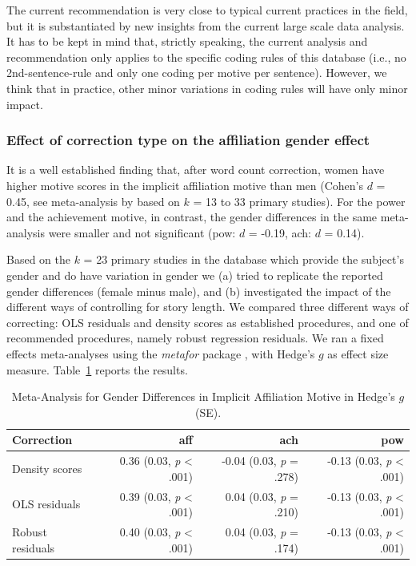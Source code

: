 \documentclass[man,a4paper,mask]{apa6}\usepackage[]{graphicx}\usepackage[]{color}
\begin{document}
The current recommendation is very close to typical current practices in the field, but it is substantiated by new insights from the current large scale data analysis. It has to be kept in mind that, strictly speaking, the current analysis and recommendation only applies to the specific coding rules of this database (i.e., no 2nd-sentence-rule and only one coding per motive per sentence). However, we think that in practice, other minor variations in coding rules will have only minor impact.


\subsubsection{Effect of correction type on the affiliation gender effect}
It is a well established finding that, after word count correction, women have higher motive scores in the implicit affiliation motive than men (Cohen's $d$ = 0.45, see meta-analysis by  based on $k$ = 13 to 33 primary studies). 
For the power and the achievement motive, in contrast, the gender differences in the same meta-analysis were smaller and not significant (pow: $d$ = -0.19, ach: $d$ = 0.14).

Based on the $k$ = 23 primary studies in the database which provide the subject's gender and do have variation in gender we (a) tried to replicate the reported gender differences (female minus male), and (b) investigated the impact of the different ways of controlling for story length.
We compared three different ways of correcting: OLS residuals and density scores as established procedures, and one of recommended procedures, namely robust regression residuals. We ran a fixed effects meta-analyses using the \emph{metafor} package \parencite{viechtbauer_conducting_2010}, with Hedge's $g$ as effect size measure. Table~\ref{tab:MA} reports the results. 

\begin{table}
		\caption{Meta-Analysis for Gender Differences in Implicit Affiliation Motive in Hedge's $g$ (SE).}
		\label{tab:MA}
		\footnotesize
		\begin{tabularx}{\textwidth}{lrrr}
		\toprule

Correction & aff & ach & pow \\ 
  \hline
Density scores & 0.36 (0.03, \emph{p} < .001) & -0.04 (0.03, \emph{p} = .278) & -0.13 (0.03, \emph{p} < .001) \\ 
  OLS residuals & 0.39 (0.03, \emph{p} < .001) & 0.04 (0.03, \emph{p} = .210) & -0.13 (0.03, \emph{p} < .001) \\ 
  Robust residuals & 0.40 (0.03, \emph{p} < .001) & 0.04 (0.03, \emph{p} = .174) & -0.13 (0.03, \emph{p} < .001) \\ 
   \hline

		\bottomrule
		\end{tabularx}
\end{table}
\end{document}
